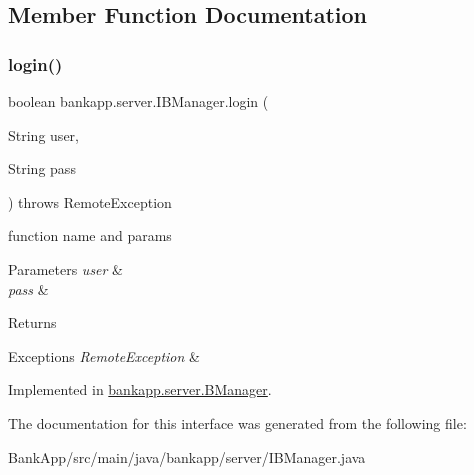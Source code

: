 \subsection{Member Function Documentation}
\mbox{\label{interfacebankapp_1_1server_1_1IBManager_a29f3426c104732dda17dc8b215b746e1}} 
\subsubsection{\texorpdfstring{login()}{login()}}
{\footnotesize\ttfamily boolean bankapp.\+server.\+I\+B\+Manager.\+login (\begin{DoxyParamCaption}\item[{String}]{user,  }\item[{String}]{pass }\end{DoxyParamCaption}) throws Remote\+Exception}



function name and params 


\begin{DoxyParams}{Parameters}
{\em user} & \\
\hline
{\em pass} & \\
\hline
\end{DoxyParams}
\begin{DoxyReturn}{Returns}

\end{DoxyReturn}

\begin{DoxyExceptions}{Exceptions}
{\em Remote\+Exception} & \\
\hline
\end{DoxyExceptions}


Implemented in \hyperlink{classbankapp_1_1server_1_1BManager_abdeb5e23b534babeed067c3667fcafd3}{bankapp.\+server.\+B\+Manager}.



The documentation for this interface was generated from the following file\+:\begin{DoxyCompactItemize}
\item 
Bank\+App/src/main/java/bankapp/server/I\+B\+Manager.\+java\end{DoxyCompactItemize}
